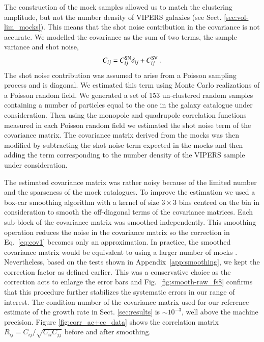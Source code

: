 \documentclass[longauth]{aa}
\begin{document}
The construction of the mock samples allowed us to match the clustering amplitude, but not the number density of VIPERS galaxies (see Sect. \ref{sec:vol-lim_mocks}).  This means that the shot noise contribution in the covariance is not accurate.  We modelled the covariance as the sum of two terms, the sample variance and shot noise,
    \begin{equation}
        C_{ij} = C_{ij}^{\rm{SN}} \delta_{ij} + C_{ij}^{\rm{SV}}\; .                                                                                               \label{eq:cov2}
    \end{equation}
The shot noise contribution was assumed to arise from a Poisson sampling process and is diagonal. We estimated this term using Monte Carlo realizations of a Poisson random field.  We generated a set of 153 un-clustered random samples containing a number of particles equal to the one in the galaxy catalogue under consideration.  Then using the monopole and quadrupole correlation functions measured in each Poisson random field we estimated the shot noise term of the covariance matrix.  The covariance matrix derived from the mocks was then modified by subtracting the shot noise term expected in the mocks and then adding the term corresponding to the number density of the VIPERS sample under consideration.

The estimated covariance matrix was rather noisy because of the limited number and the sparseness of the mock catalogues. To improve the estimation we used a box-car smoothing algorithm \citep{mandelbaum13} with a kernel of size $3\times3$ bins centred on the bin in consideration to smooth the off-diagonal terms of the covariance matrices.  Each sub-block of the covariance matrix was smoothed independently. This smoothing operation reduces the noise in the covariance matrix so the correction in Eq.~\eqref{eq:cov1} becomes only an approximation. In practice, the smoothed covariance matrix would be equivalent to using a larger number of mocks \citep{dodelson13}. Nevertheless, based on the tests shown in Appendix~\ref{app:smoothing}, we kept the correction factor as defined earlier.  This was a conservative choice as the correction acts to enlarge the error bars and Fig.~\ref{fig:smooth-raw_fs8} confirms that this procedure further stabilizes the systematic errors in our range of interest.  The condition number of the covariance matrix used for our reference estimate of the growth rate in Sect. \ref{sec:results} is $\sim10^{-3}$, well above the machine precision. Figure \ref{fig:corr_ac+cc_data} shows the correlation matrix $R_{ij}=C_{ij}/\sqrt{C_{ii}C_{jj}}$ before and after smoothing. 
\end{document}
